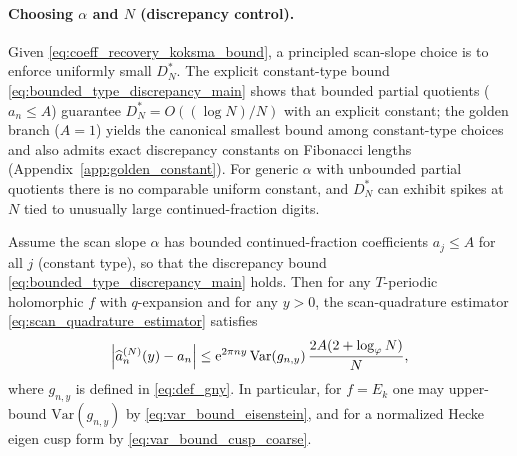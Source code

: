\paragraph{Choosing \texorpdfstring{$\alpha$}{alpha} and \texorpdfstring{$N$}{N} (discrepancy control).}
Given \eqref{eq:coeff_recovery_koksma_bound}, a principled scan-slope choice is to enforce uniformly small $D_N^\ast$. The explicit constant-type bound \eqref{eq:bounded_type_discrepancy_main} shows that bounded partial quotients ($a_n\le A$) guarantee $D_N^\ast=O((\log N)/N)$ with an explicit constant; the golden branch ($A=1$) yields the canonical smallest bound among constant-type choices and also admits exact discrepancy constants on Fibonacci lengths (Appendix~\ref{app:golden_constant}).
For generic $\alpha$ with unbounded partial quotients there is no comparable uniform constant, and $D_N^\ast$ can exhibit spikes at $N$ tied to unusually large continued-fraction digits.

\begin{corollary}
\label{cor:const_type_design_inequality}
Assume the scan slope $\alpha$ has bounded continued-fraction coefficients $a_j\le A$ for all $j$ (constant type), so that the discrepancy bound \eqref{eq:bounded_type_discrepancy_main} holds.
Then for any $T$-periodic holomorphic $f$ with $q$-expansion and for any $y>0$, the scan-quadrature estimator \eqref{eq:scan_quadrature_estimator} satisfies
\begin{equation}
\left|\widehat a_n^{(N)}(y)-a_n\right|
\le
\mathrm{e}^{2\pi n y}\,\mathrm{Var}(g_{n,y})\,\frac{2A(2+\log_\varphi N)}{N},
\label{eq:const_type_design_bound}
\end{equation}
where $g_{n,y}$ is defined in \eqref{eq:def_gny}.
In particular, for $f=E_k$ one may upper-bound $\mathrm{Var}(g_{n,y})$ by \eqref{eq:var_bound_eisenstein}, and for a normalized Hecke eigen cusp form by \eqref{eq:var_bound_cusp_coarse}.
\end{corollary}

